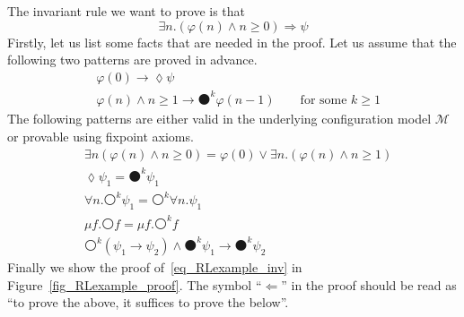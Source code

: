 \documentclass[letter,12pt]{article}
\newcommand{\imp}{\to}
\newcommand{\To}{\Rightarrow}
\newcommand{\MM}{\mathcal{M}}
\newcommand{\wnext}{{\medcirc}}
\newcommand{\snext}{{\medbullet}}
\newcommand{\eventually}{{\lozenge}}
\begin{document}
The invariant rule we want to prove is that
\begin{equation}\label{eq_RLexample_inv}
\exists n . (\varphi(n) \wedge n \ge 0) \To \psi \tag{Invariant}
\end{equation}
Firstly, let us list some facts that are needed in the proof.
Let us assume that the following two patterns are proved in advance.
\begin{align}
&\varphi(0) \imp \eventually \psi
\tag{Base Case}\label{eq_RLexample_base_case}
\\
&\varphi(n) \wedge n \ge 1 \imp \snext^k \varphi(n-1)
\qquad \text{for some $k \ge 1$}
\tag{Loop Body}\label{eq_RLexample_loop_body}
\end{align}
The following patterns are either valid in the underlying
configuration model $\MM$ or provable using fixpoint axioms.
\begin{align}
&\exists n (\varphi(n) \wedge n \ge 0) 
 = \varphi(0) \vee \exists n . (\varphi(n) \wedge n \ge 1)
\tag{Domain}\label{eq_RLexample_domain}
\\
&\eventually \psi_1 = \snext^k \psi_1
\tag{Next Eventually}\label{eq_RLexample_next_eventually}
\\
&\forall n . \wnext^k \psi_1 = \wnext^k \forall n . \psi_1
\tag{Comm}\label{eq_RLexample_comm}
\\
&\mu f . \wnext f = \mu f . \wnext^k f
\tag{Fix Next}\label{eq_RLexample_fix_wnext}
\\
&\wnext^k(\psi_1 \imp \psi_2) \wedge \snext^k \psi_1 \imp \snext^k \psi_2
\tag{Progress}\label{eq_RLexample_progress}
\end{align}
Finally we show the proof of~\eqref{eq_RLexample_inv} in 
Figure~\ref{fig_RLexample_proof}.
The symbol ``$\Longleftarrow$'' in the proof should be read as
``to prove the above, it suffices to prove the below''.
\end{document}

